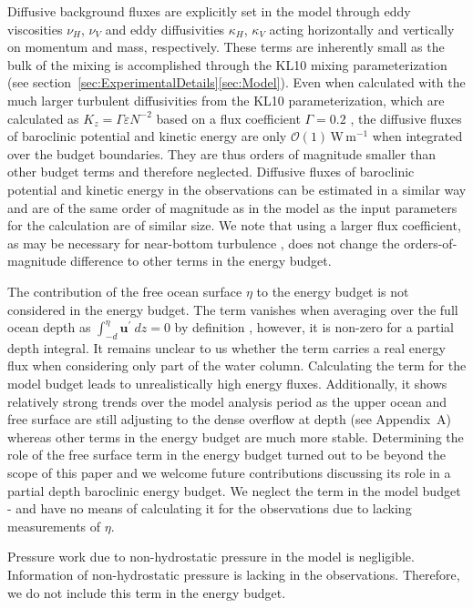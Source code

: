\documentclass{ametsocV6.1}
\begin{document}
Diffusive background fluxes are explicitly set in the model through eddy viscosities $\nu_H$, $\nu_V$ and eddy diffusivities $\kappa_H$, $\kappa_V$ acting horizontally and vertically on momentum and mass, respectively.
These terms are inherently small as the bulk of the mixing is accomplished through the KL10 mixing parameterization (see section~\ref{sec:ExperimentalDetails}\ref{sec:Model}).
Even when calculated with the much larger turbulent diffusivities from the KL10 parameterization, which are calculated as $K_z = \Gamma \varepsilon N^{-2}$ based on a flux coefficient $\Gamma=0.2$ \citep{klymaklegg10}, the diffusive fluxes of baroclinic potential and kinetic energy are only $\mathcal{O}(1)$\,W\,m$^{-1}$ when integrated over the budget boundaries.
They are thus orders of magnitude smaller than other budget terms and therefore neglected.
Diffusive fluxes of baroclinic potential and kinetic energy in the observations can be estimated in a similar way and are of the same order of magnitude as in the model as the input parameters for the calculation are of similar size.
We note that using a larger flux coefficient, as may be necessary for near-bottom turbulence \citep[e.g.][]{ijichietal20,spingysetal21}, does not change the orders-of-magnitude difference to other terms in the energy budget.

The contribution of the free ocean surface $\eta$ to the energy budget is not considered in the energy budget.
The term vanishes when averaging over the full ocean depth as $\int_{-d}^\eta \mathbf{u^\prime}\ dz = 0$ by definition \cite[e.g.][]{kang10}, however, it is non-zero for a partial depth integral.
It remains unclear to us whether the term carries a real energy flux when considering only part of the water column.
Calculating the term for the model budget leads to unrealistically high energy fluxes.
Additionally, it shows relatively strong trends over the model analysis period as the upper ocean and free surface are still adjusting to the dense overflow at depth (see Appendix~A) whereas other terms in the energy budget are much more stable.
Determining the role of the free surface term in the energy budget turned out to be beyond the scope of this paper and we welcome future contributions discussing its role in a partial depth baroclinic energy budget.
We neglect the term in the model budget - and have no means of calculating it for the observations due to lacking measurements of $\eta$.

Pressure work due to non-hydrostatic pressure in the model is negligible.
Information of non-hydrostatic pressure is lacking in the observations.
Therefore, we do not include this term in the energy budget.
\end{document}
